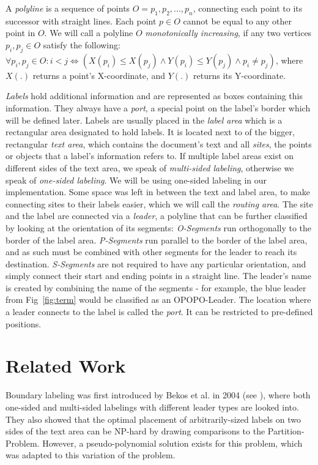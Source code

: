 \documentclass[11pt,a4paper]{vutinfth}
\begin{document}
A \emph{polyline} is a sequence of points $O=p_1, p_2, ...,p_n$, connecting each point to its successor with straight lines. Each point $p \in O$ cannot be equal to any other point in $O$.
We will call a polyline $O$ \emph{monotonically increasing}, if any two vertices $p_i, p_j \in O$ satisfy the following: $\forall p_i, p_j \in O: i<j \iff (X(p_i)\leq X(p_j) \land Y(p_i)\leq Y(p_j)\land p_i \neq p_j)$, where $X(.)$ returns a point's X-coordinate, and $Y(.)$ returns its Y-coordinate.

\emph{Labels} hold additional information and are represented as boxes containing this information. They always have a \emph{port}, a special point on the label's border which will be defined later. Labels are usually placed in the \emph{label area} which is a rectangular area designated to hold labels. It is located next to of the bigger, rectangular \emph{text area}, which contains the document's text and all \emph{sites}, the points or objects that a label's information refers to. If multiple label areas exist on different sides of the text area, we speak of \emph{multi-sided labeling}, otherwise we speak of \emph{one-sided labeling}. We will be using one-sided labeling in our implementation. Some space was left in between the text and label area, to make connecting sites to their labels easier, which we will call the \emph{routing area}. The site and the label are connected via a \emph{leader}, a polyline that can be further classified by looking at the orientation of its segments: \emph{O-Segments} run orthogonally to the border of the label area. \emph{P-Segments} run parallel to the border of the label area, and as such must be combined with other segments for the leader to reach its destination. \emph{S-Segments} are not required to have any particular orientation, and simply connect their start and ending points in a straight line.
The leader's name is created by combining the name of the segments - for example, the blue leader from Fig~\ref{fig:term} would be classified as an OPOPO-Leader.
The location where a leader connects to the label is called the \emph{port}. It can be restricted to pre-defined positions. %


\section{Related Work}

Boundary labeling was first introduced by Bekos et al. in 2004 (see \cite{Bekos2005}), where both one-sided and multi-sided labelings with different leader types are looked into. They also showed that the optimal placement of arbitrarily-sized labels on two sides of the text area can be NP-hard by drawing comparisons to the Partition-Problem. However, a pseudo-polynomial solution exists for this problem, which was adapted to this variation of the problem.
\end{document}
